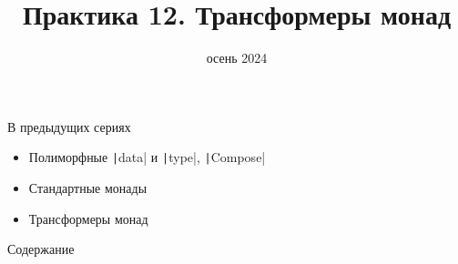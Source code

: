 
\newif\ifhandout




\title[12. Трансформеры монад]{Практика 12. Трансформеры монад}
\date{осень 2024}



    \setcounter{framenumber}{-1}
    \maketitle

    \begin{frame}[fragile]{В предыдущих сериях}
        \begin{itemize}
            \item Полиморфные \texttt|data| и \texttt|type|, \texttt|Compose|
            \item Стандартные монады
            \item[\newtopic] Трансформеры монад
        \end{itemize}
    \end{frame}

    \begin{frame}[noframenumbering]{Содержание}
        \tableofcontents
    \end{frame}


